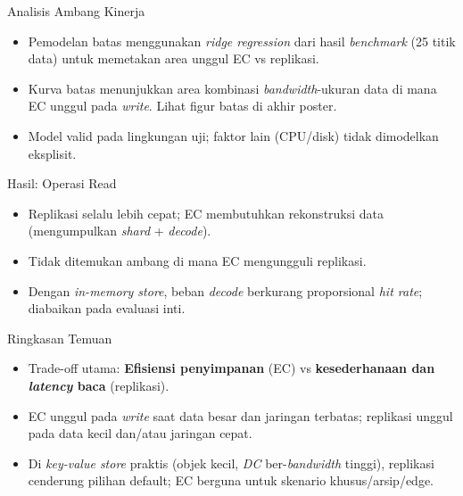 \documentclass[a2,portrait]{config/poster/a0poster}
\newcommand{\postersection}[1]{%
	\begin{tcolorbox}[
		colback=ITBblue,
		colframe=ITBblue,
		fonttitle=\bfseries,
		coltext=white,
		sharp corners,
		boxrule=0pt,
		top=0pt,
		bottom=0pt,
		halign=center
	]
	\normalsize #1
	\end{tcolorbox}%
}
\begin{document}
\begin{multicols}{2}
\postersection{Analisis Ambang Kinerja}
\begin{itemize}[leftmargin=*, itemsep=2pt]
	\item Pemodelan batas menggunakan \textit{ridge regression} dari hasil \textit{benchmark} (25 titik data) untuk memetakan area unggul EC vs replikasi.
	\item Kurva batas menunjukkan area kombinasi \textit{bandwidth}-ukuran data di mana EC unggul pada \textit{write}. Lihat figur batas di akhir poster.
	\item Model valid pada lingkungan uji; faktor lain (CPU/disk) tidak dimodelkan eksplisit.
\end{itemize}


\postersection{Hasil: Operasi Read}
\begin{itemize}[leftmargin=*, itemsep=2pt]
	\item Replikasi selalu lebih cepat; EC membutuhkan rekonstruksi data (mengumpulkan \textit{shard} + \textit{decode}).
	\item Tidak ditemukan ambang di mana EC mengungguli replikasi.
	\item Dengan \textit{in-memory store}, beban \textit{decode} berkurang proporsional \textit{hit rate}; diabaikan pada evaluasi inti.
\end{itemize}


\postersection{Ringkasan Temuan}
\begin{itemize}[leftmargin=*, itemsep=2pt]
	\item Trade-off utama: \textbf{Efisiensi penyimpanan} (EC) vs \textbf{kesederhanaan dan \textit{latency} baca} (replikasi).
	\item EC unggul pada \textit{write} saat data besar dan jaringan terbatas; replikasi unggul pada data kecil dan/atau jaringan cepat.
	\item Di \textit{key-value store} praktis (objek kecil, \textit{DC} ber-\textit{bandwidth} tinggi), replikasi cenderung pilihan default; EC berguna untuk skenario khusus/arsip/edge.
\end{itemize}


\end{multicols}
\end{document}
